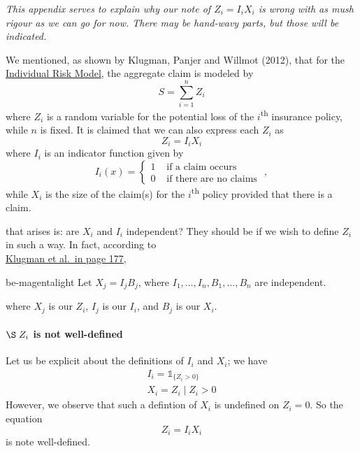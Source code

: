 \documentclass[notoc,notitlepage]{tufte-book}
\begin{document}
\textit{This appendix serves to explain why our note of $Z_i = I_i X_i$ is wrong with as mush rigour as we can go for now. There may be hand-wavy parts, but those will be indicated.} 

We mentioned, as shown by Klugman, Panjer and Willmot (2012)\cite{KlugmanPanjerWillmot2012}, that for the \hyperref[defn:individual_risk_model]{Individual Risk Model}, the aggregate claim is modeled by
\begin{equation*}
  S = \sum_{i=1}^{n} Z_i
\end{equation*}
where $Z_i$ is a random variable for the potential loss of the $i$\textsuperscript{th} insurance policy, while $n$ is fixed. It is claimed that we can also express each $Z_i$ as
\begin{equation*}
  Z_i = I_i X_i
\end{equation*}
where $I_i$ is an indicator function given by
\begin{equation*}
  I_i(x) = \begin{cases}
    1 & \text{ if a claim occurs } \\
    0 & \text{ if there are no claims }
  \end{cases},
\end{equation*}
while $X_i$ is the size of the claim(s) for the $i$\textsuperscript{th} policy provided that there is a claim.

 that arises is: are $X_i$ and $I_i$ independent? They should be if we wish to define $Z_i$ in such a way. In fact, according to \\
\noindent\textcolor{be-magenta}{\underline{Klugman et al.\ in page 177}},

\begin{quotebox}{be-magenta}{light}
  Let $X_j = I_j B_j$, where $I_1, \ldots, I_n, B_1, \ldots, B_n$ are independent.
\end{quotebox}

where $X_j$ is our $Z_i$, $I_j$ is our $I_i$, and $B_j$ is our $X_i$.

\paragraph{$\S \; Z_i$ is not well-defined} Let us be explicit about the definitions of $I_i$ and $X_i$; we have
\begin{gather*}
  I_i = \mathbb{1}_{\{ Z_i > 0 \}} \\
  X_i = Z_i \mid Z_i > 0
\end{gather*}
However, we observe that such a defintion of $X_i$ is undefined on $Z_i = 0$. So the equation
\begin{equation*}
  Z_i = I_i X_i
\end{equation*}
is note well-defined.
\end{document}
